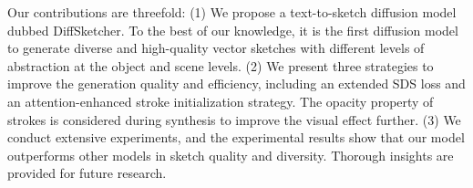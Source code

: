 \documentclass{article}
\begin{document}

Our contributions are threefold: 
(1) We propose a text-to-sketch diffusion model dubbed DiffSketcher. To the best of our knowledge, it is the first diffusion model to generate diverse and high-quality vector sketches with different levels of abstraction at the object and scene levels. 
(2) We present three strategies to improve the generation quality and efficiency, including an extended SDS loss and an attention-enhanced stroke initialization strategy. The opacity property of strokes is considered during synthesis to improve the visual effect further. 
(3) We conduct extensive experiments, and the experimental results show that our model outperforms other models in sketch quality and diversity. Thorough insights are provided for future research.
\end{document}
